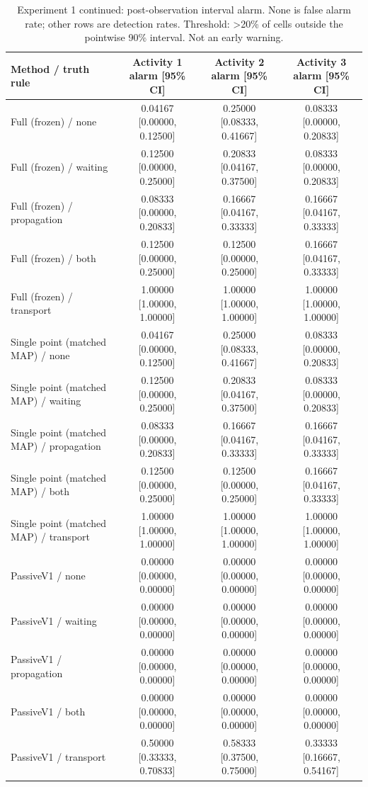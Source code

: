 \begin{table}[t]
\centering
\small
\caption{Experiment 1 continued: post-observation interval alarm. None is false alarm rate; other rows are detection rates. Threshold: >20\% of cells outside the pointwise 90\% interval. Not an early warning.}
\begin{tabular}{lccc}
\toprule
Method / truth rule & Activity 1 alarm [95\% CI] & Activity 2 alarm [95\% CI] & Activity 3 alarm [95\% CI] \\
\midrule
Full (frozen) / none & 0.04167 [0.00000, 0.12500] & 0.25000 [0.08333, 0.41667] & 0.08333 [0.00000, 0.20833] \\
Full (frozen) / waiting & 0.12500 [0.00000, 0.25000] & 0.20833 [0.04167, 0.37500] & 0.08333 [0.00000, 0.20833] \\
Full (frozen) / propagation & 0.08333 [0.00000, 0.20833] & 0.16667 [0.04167, 0.33333] & 0.16667 [0.04167, 0.33333] \\
Full (frozen) / both & 0.12500 [0.00000, 0.25000] & 0.12500 [0.00000, 0.25000] & 0.16667 [0.04167, 0.33333] \\
Full (frozen) / transport & 1.00000 [1.00000, 1.00000] & 1.00000 [1.00000, 1.00000] & 1.00000 [1.00000, 1.00000] \\
Single point (matched MAP) / none & 0.04167 [0.00000, 0.12500] & 0.25000 [0.08333, 0.41667] & 0.08333 [0.00000, 0.20833] \\
Single point (matched MAP) / waiting & 0.12500 [0.00000, 0.25000] & 0.20833 [0.04167, 0.37500] & 0.08333 [0.00000, 0.20833] \\
Single point (matched MAP) / propagation & 0.08333 [0.00000, 0.20833] & 0.16667 [0.04167, 0.33333] & 0.16667 [0.04167, 0.33333] \\
Single point (matched MAP) / both & 0.12500 [0.00000, 0.25000] & 0.12500 [0.00000, 0.25000] & 0.16667 [0.04167, 0.33333] \\
Single point (matched MAP) / transport & 1.00000 [1.00000, 1.00000] & 1.00000 [1.00000, 1.00000] & 1.00000 [1.00000, 1.00000] \\
PassiveV1 / none & 0.00000 [0.00000, 0.00000] & 0.00000 [0.00000, 0.00000] & 0.00000 [0.00000, 0.00000] \\
PassiveV1 / waiting & 0.00000 [0.00000, 0.00000] & 0.00000 [0.00000, 0.00000] & 0.00000 [0.00000, 0.00000] \\
PassiveV1 / propagation & 0.00000 [0.00000, 0.00000] & 0.00000 [0.00000, 0.00000] & 0.00000 [0.00000, 0.00000] \\
PassiveV1 / both & 0.00000 [0.00000, 0.00000] & 0.00000 [0.00000, 0.00000] & 0.00000 [0.00000, 0.00000] \\
PassiveV1 / transport & 0.50000 [0.33333, 0.70833] & 0.58333 [0.37500, 0.75000] & 0.33333 [0.16667, 0.54167] \\
\bottomrule
\end{tabular}
\end{table}
